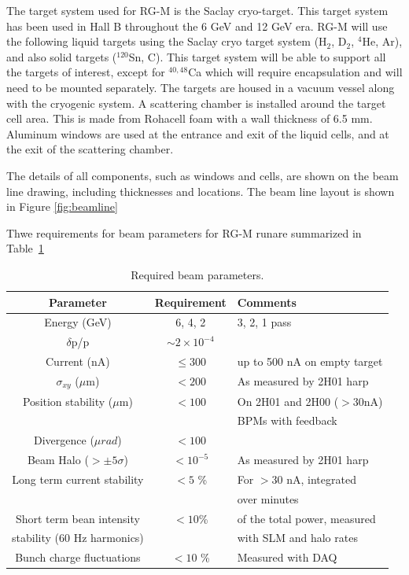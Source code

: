 \documentclass[12pt]{article}
\begin{document}
The target system used for RG-M is the Saclay cryo-target.  This target system has been used in Hall B throughout the 6 GeV and 12 GeV era. RG-M will use the following liquid targets using the Saclay cryo target system (H$_2$, D$_2$, ${}^{4}$He, Ar), and also solid targets (${}^{120}$Sn, C). This target system will be able to support all the targets of interest, except for ${}^{40,48}$Ca which will require encapsulation and will need to be mounted separately. The targets are housed in a vacuum vessel along with the cryogenic system.  A scattering chamber is installed around the target cell area.  This is made from Rohacell foam with a wall thickness of 6.5 mm.  Aluminum windows are used at the entrance and exit of the liquid cells, and at the exit of the scattering chamber.

The details of all components, such as windows and cells, are shown on the beam line drawing, including thicknesses and locations.  The beam line layout is shown in Figure \ref{fig:beamline}


Thwe requirements for beam parameters for RG-M runare summarized in Table~\ref{tab:beam_par}

 \begin{table}[htb]
\caption{Required beam parameters.}\label{tab:beam_par}
\centering
 \begin{tabular}{|c|c|l|}
\hline
Parameter & Requirement &Comments \\ \hline 
Energy (GeV) & 6, 4, 2   & 3, 2, 1 pass  \\  \hline
$\delta$p/p & $\sim 2\times 10^{-4}$ & \\ \hline 
Current (nA) & $\le 300$ &up to 500 nA on empty target  \\  \hline
$\sigma_{xy}$ ($\mu$m) &$ < 200$& As measured by 2H01 harp \\ \hline 
Position stability ($\mu$m) & $< 100$ & On 2H01 and 2H00 ($>30$nA) \\ 
&&BPMs with feedback \\ \hline
Divergence ($\mu rad$) & $< 100$&  \\ \hline 
Beam Halo ($> \pm 5\sigma$) &$< 10^{-5}$&As measured by 2H01 harp \\ \hline
Long term current stability & $< 5$ \% & For $>30$ nA, integrated \\
&&over minutes \\ \hline 
Short term bean intensity & $<10$\%& of the total power, measured \\stability (60 Hz harmonics) && with SLM and halo rates \\ \hline
Bunch charge fluctuations &$< 10$ \% & Measured with DAQ \\ \hline
 \end{tabular}
\end{table}
\end{document}
